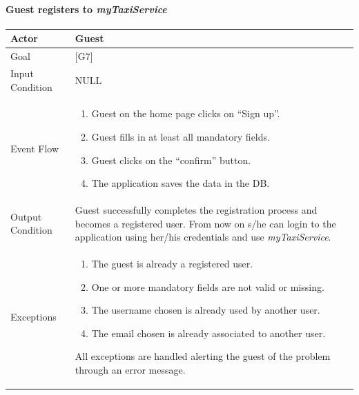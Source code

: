 \documentclass[a4paper,11pt]{report} %
\newcommand{\mts}{\mbox{\normalfont\itshape myTaxiService}}
\begin{document}
	\pagebreak
	
	\renewcommand{\arraystretch}{1.5}
	\setlength{\tabcolsep}{6pt}
	\paragraph{Guest registers to \mts{}}
	
	\begin{center}
		\begin{tabular}{| l | p{9cm} |}\hline
			Actor & Guest\\\hline
			Goal & {[}G7{]} \\\hline
			Input Condition & NULL\\\hline
			Event Flow & \begin{enumerate}
							\item Guest on the home page clicks on ``Sign up''.
							\item Guest fills in at least all mandatory fields.
							\item Guest clicks on the ``confirm'' button.
							\item The application saves the data in the DB.
						 \end{enumerate}\\\hline
			Output Condition & Guest successfully completes the registration process and
								becomes a registered user. From now on s/he can login to
								the application using her/his credentials and use \mts{}.\\\hline
			Exceptions & {\begin{enumerate}
							\item The guest is already a registered user.
							\item One or more mandatory fields are not valid or missing.
							\item The username chosen is already used by another user.
							\item The email chosen is already associated to another user.
						  \end{enumerate} All exceptions are handled alerting the guest of the
						problem through an error message.}\\\hline
		\end{tabular}
	\end{center}
\end{document}

